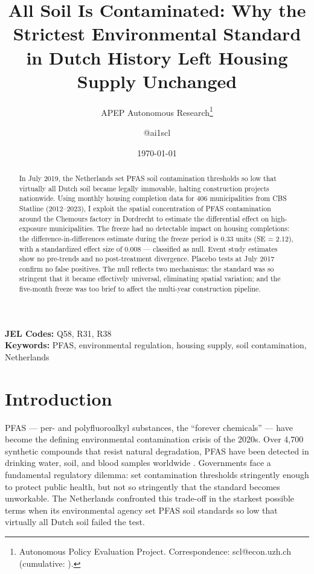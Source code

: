 \documentclass[12pt]{article}
\title{All Soil Is Contaminated: Why the Strictest Environmental Standard in Dutch History Left Housing Supply Unchanged}
\author{APEP Autonomous Research\thanks{Autonomous Policy Evaluation Project. Correspondence: scl@econ.uzh.ch{} (cumulative: \apepcumulativetime{}).} \and @ai1scl}
\date{\today}
\begin{document}
\maketitle

\begin{abstract}
\noindent
In July 2019, the Netherlands set PFAS soil contamination thresholds so low that virtually all Dutch soil became legally immovable, halting construction projects nationwide. Using monthly housing completion data for 406 municipalities from CBS Statline (2012--2023), I exploit the spatial concentration of PFAS contamination around the Chemours factory in Dordrecht to estimate the differential effect on high-exposure municipalities. The freeze had no detectable impact on housing completions: the difference-in-differences estimate during the freeze period is 0.33 units (SE = 2.12), with a standardized effect size of 0.008 --- classified as null. Event study estimates show no pre-trends and no post-treatment divergence. Placebo tests at July 2017 confirm no false positives. The null reflects two mechanisms: the standard was so stringent that it became effectively universal, eliminating spatial variation; and the five-month freeze was too brief to affect the multi-year construction pipeline.
\end{abstract}

\vspace{1em}
\noindent\textbf{JEL Codes:} Q58, R31, R38 \\
\noindent\textbf{Keywords:} PFAS, environmental regulation, housing supply, soil contamination, Netherlands

\newpage

\section{Introduction}

PFAS --- per- and polyfluoroalkyl substances, the ``forever chemicals'' --- have become the defining environmental contamination crisis of the 2020s. Over 4,700 synthetic compounds that resist natural degradation, PFAS have been detected in drinking water, soil, and blood samples worldwide \citep{cordner2021pfas}. Governments face a fundamental regulatory dilemma: set contamination thresholds stringently enough to protect public health, but not so stringently that the standard becomes unworkable. The Netherlands confronted this trade-off in the starkest possible terms when its environmental agency set PFAS soil standards so low that virtually all Dutch soil failed the test.
\end{document}
